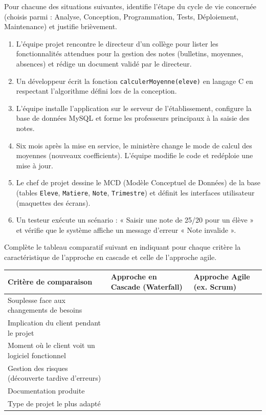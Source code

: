 \documentclass[11pt]{article}
\begin{document}
\begin{exercice}
Pour chacune des situations suivantes, identifie l'étape du cycle de vie concernée (choisis parmi : Analyse, Conception, Programmation, Tests, Déploiement, Maintenance) et justifie brièvement.
\begin{enumerate}
    \item L'équipe projet rencontre le directeur d'un collège pour lister les fonctionnalités attendues pour la gestion des notes (bulletins, moyennes, absences) et rédige un document validé par le directeur.
    \item Un développeur écrit la fonction \texttt{calculerMoyenne(eleve)} en langage C en respectant l'algorithme défini lors de la conception.
    \item L'équipe installe l'application sur le serveur de l'établissement, configure la base de données MySQL et forme les professeurs principaux à la saisie des notes.
    \item Six mois après la mise en service, le ministère change le mode de calcul des moyennes (nouveaux coefficients). L'équipe modifie le code et redéploie une mise à jour.
    \item Le chef de projet dessine le MCD (Modèle Conceptuel de Données) de la base (tables \texttt{Eleve}, \texttt{Matiere}, \texttt{Note}, \texttt{Trimestre}) et définit les interfaces utilisateur (maquettes des écrans).
    \item Un testeur exécute un scénario : « Saisir une note de 25/20 pour un élève » et vérifie que le système affiche un message d'erreur « Note invalide ».
\end{enumerate}
\end{exercice}

\begin{exercice}
Complète le tableau comparatif suivant en indiquant pour chaque critère la caractéristique de l'approche en cascade et celle de l'approche agile.

\begin{center}
\begin{tabularx}{\linewidth}{|l|X|X|}
\hline
\textbf{Critère de comparaison} & \textbf{Approche en Cascade (Waterfall)} & \textbf{Approche Agile (ex. Scrum)} \\
\hline
Souplesse face aux changements de besoins & & \\
\hline
Implication du client pendant le projet & & \\
\hline
Moment où le client voit un logiciel fonctionnel & & \\
\hline
Gestion des risques (découverte tardive d'erreurs) & & \\
\hline
Documentation produite & & \\
\hline
Type de projet le plus adapté & & \\
\hline
\end{tabularx}
\end{center}
\end{exercice}
\end{document}
